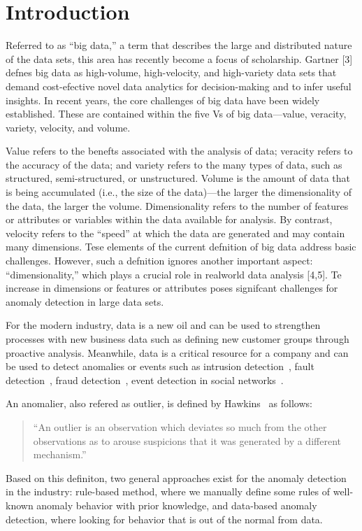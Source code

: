 \section{Introduction}\label{sec-intro}


Referred to as “big data,” 
a term that describes the large and distributed 
nature of the data sets,
this area has recently become a focus of scholarship.
Gartner [3] defnes big
data as high-volume,
high-velocity,
and high-variety data sets that demand cost-efective
novel data analytics for decision-making and to infer useful insights.
In recent years,
the core challenges of big data have been widely established.
These are contained within the
five Vs of big data—value,
veracity,
variety,
velocity,
and volume.

Value refers to the benefts associated with the analysis of data; veracity refers to the
accuracy of the data; and variety refers to the many types of data,
such as structured,
semi-structured,
or unstructured.
Volume is the amount of data that is being accumulated (i.e.,
the size of the data)—the larger the dimensionality of the data,
the larger
the volume.
Dimensionality refers to the number of features or attributes or variables within the data available for analysis.
By contrast,
velocity refers to the “speed” at
which the data are generated and may contain many dimensions.
Tese elements of
the current defnition of big data address basic challenges.
However,
such a defnition
ignores another important aspect: “dimensionality,” which
plays a crucial role in realworld data analysis [4,5].
Te increase in dimensions or features or attributes poses
signifcant challenges for anomaly detection in large data sets.

For the modern industry, 
data is a new oil and 
can be used to strengthen processes with new business data 
such as defining new customer groups through proactive analysis. 
Meanwhile, 
data is a critical resource for a company and 
can be used to detect anomalies or events such as 
intrusion detection~\cite{garcia2009anomaly}, 
fault detection~\cite{hwang2009survey}, 
fraud detection~\cite{bolton2002statistical},
event detection in social networks~\cite{sakaki2010earthquake}.

An anomalier,
also refered as outlier,
is defined by Hawkins~\cite{hawkins1980identification}
as follows:
\begin{quotation}
``An outlier is an observation which
deviates so much from the other observations
as to arouse suspicions that
it was generated by a different mechanism.''
\end{quotation}
Based on this definiton,
two general approaches exist for the anomaly
detection in the industry:
rule-based method,
where we manually define some rules of
well-known anomaly behavior
with prior knowledge,
and data-based anomaly detection,
where looking for behavior that
is out of the normal from data.

